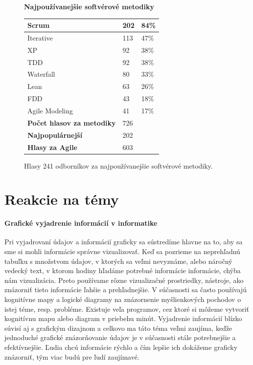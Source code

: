\documentclass[10pt,slovak,a4paper]{article}
\begin{document}
\begin{figure} [H]
\begin{center}
\textbf{Najpoužívanejšie softvérové metodiky}
\begin{tabular}{|l|ll|}
\hline
Scrum                             & \multicolumn{1}{l|}{202} & 84\% \\ \hline
Iterative                         & \multicolumn{1}{l|}{113} & 47\% \\ \hline
XP                                & \multicolumn{1}{l|}{92}  & 38\% \\ \hline
TDD                               & \multicolumn{1}{l|}{92}  & 38\% \\ \hline
Waterfall                         & \multicolumn{1}{l|}{80}  & 33\% \\ \hline
Lean                              & \multicolumn{1}{l|}{63}  & 26\% \\ \hline
FDD                               & \multicolumn{1}{l|}{43}  & 18\% \\ \hline
Agile Modeling                    & \multicolumn{1}{l|}{41}  & 17\% \\ \hline
\textbf{Počet hlasov za metodiky} & \multicolumn{2}{l|}{726}        \\ \hline
\textbf{Najpopulárnejší}          & \multicolumn{2}{l|}{202}        \\ \hline
\textbf{Hlasy za Agile}           & \multicolumn{2}{l|}{603}        \\ \hline
\end{tabular}
\caption{Hlasy 241 odborníkov za najpoužívanejšie softvérové metodiky.~\cite{forrester}}
\end{center}
\end{figure}

\section{Reakcie na témy} \label{reakcie}

\paragraph{Grafické vyjadrenie informácií v informatike}

Pri vyjadrovaní údajov a informácií graficky sa sústredíme hlavne na to, aby sa sme si mohli informácie správne vizualizovať. Keď sa pozrieme na neprehľadnú tabuľku s množstvom údajov, v ktorých sa veľmi nevyznáme, alebo náročný vedecký text, v ktorom hodiny hľadáme potrebné informácie informácie, chýba nám vizualizácia. Preto používame rôzne vizualizačné prostriedky, nástroje, ako znázorniť tieto informácie ľahšie a prehľadnejšie. V súčasnosti sa často používajú kognitívne mapy a logické diagramy na znázornenie myšlienkových pochodov o istej téme, resp. probléme. Existuje veľa programov, cez ktoré si môžeme vytvoriť kognitívnu mapu alebo diagram v priebehu minút. Vyjadrenie informácií blízko súvisí aj s grafickým dizajnom a celkovo ma táto téma veľmi zaujíma, keďže jednoduché grafické znázorňovanie údajov je v súčasnosti stále potrebnejšie a efektívnejšie. Ľudia chcú informácie rýchlo a čím lepšie ich dokážeme graficky znázorniť, tým viac budú pre ľudí zaujímavé.
\end{document}
